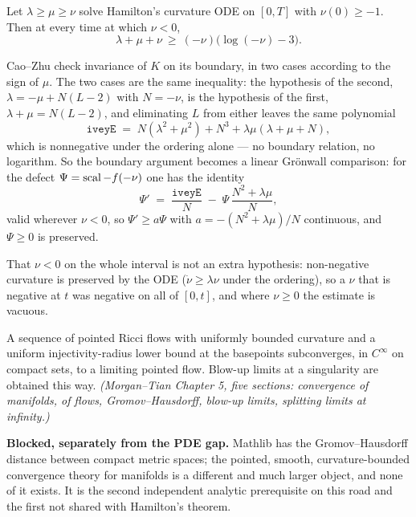 \begin{lemma}
  \label{lem:ivey-ode}
  \leanok
  Let $\lambda \ge \mu \ge \nu$ solve Hamilton's curvature ODE on $[0,T]$ with
  $\nu(0) \ge -1$. Then at every time at which $\nu < 0$,
  \[
    \lambda + \mu + \nu \ \ge\ (-\nu)\bigl(\log(-\nu) - 3\bigr).
  \]

  Cao--Zhu check invariance of $K$ on its boundary, in two cases according to the
  sign of $\mu$. The two cases are the same inequality: the hypothesis of the
  second, $\lambda = -\mu + N(L-2)$ with $N = -\nu$, is the hypothesis of the
  first, $\lambda+\mu = N(L-2)$, and eliminating $L$ from either leaves the same
  polynomial
  \[
    \texttt{iveyE} \;=\; N(\lambda^2+\mu^2) + N^3 + \lambda\mu(\lambda+\mu+N),
  \]
  which is nonnegative under the ordering alone --- no boundary relation, no
  logarithm. So the boundary argument becomes a linear Gr\"onwall comparison: for
  the defect $\Psi = \operatorname{scal} - f(-\nu)$ one has the identity
  \[
    \Psi' \;=\; \frac{\texttt{iveyE}}{N} \;-\; \Psi\,\frac{N^2 + \lambda\mu}{N},
  \]
  valid wherever $\nu < 0$, so $\Psi' \ge a\Psi$ with $a = -(N^2+\lambda\mu)/N$
  continuous, and $\Psi \ge 0$ is preserved.

  That $\nu < 0$ on the whole interval is not an extra hypothesis: non-negative
  curvature is preserved by the ODE ($\dot\nu \ge \lambda\nu$ under the ordering),
  so a $\nu$ that is negative at $t$ was negative on all of $[0,t]$, and where
  $\nu \ge 0$ the estimate is vacuous.
\end{lemma}

\begin{theorem}
  \label{thm:compactness}
  A sequence of pointed Ricci flows with uniformly bounded curvature and a
  uniform injectivity-radius lower bound at the basepoints subconverges, in
  $C^\infty$ on compact sets, to a limiting pointed flow. Blow-up limits at a
  singularity are obtained this way. \emph{(Morgan--Tian Chapter 5, five
  sections: convergence of manifolds, of flows, Gromov--Hausdorff, blow-up
  limits, splitting limits at infinity.)}

  \textbf{Blocked, separately from the PDE gap.} Mathlib has the
  Gromov--Hausdorff distance between compact metric spaces; the pointed,
  smooth, curvature-bounded convergence theory for manifolds is a different and
  much larger object, and none of it exists. It is the second independent
  analytic prerequisite on this road and the first not shared with Hamilton's
  theorem.
\end{theorem}

